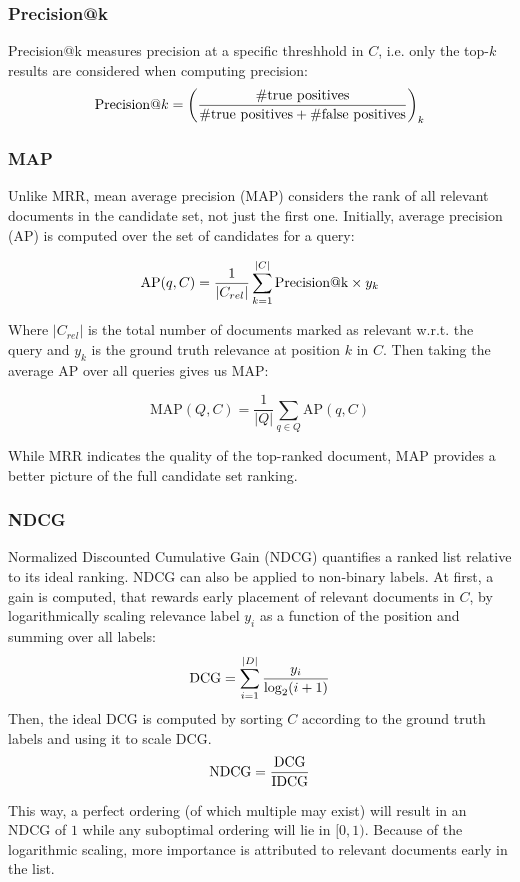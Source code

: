 \subsubsection{Precision@k}
Precision@k measures precision at a specific threshhold in $C$, i.e. only the top-$k$ results are considered when computing precision:
\begin{equation}
    \text{Precision@}k = \bigg(\frac{\text{\#true positives}}{\text{\#true positives} + \text{\#false positives}}\bigg)_k
\end{equation}

\subsubsection{MAP}
Unlike MRR, mean average precision (MAP) considers the rank of all relevant documents in the candidate set, not just the first one. Initially, average precision (AP) is computed over the set of candidates for a query:

\begin{equation}
    \text{AP}(q, C) = \frac{1}{|C_{rel}|} \sum_{k=1}^{|C|} \text{Precision@k} \times y_k
\end{equation}

Where $|C_{rel}|$ is the total number of documents marked as relevant w.r.t. the query and $y_k$ is the ground truth relevance at position $k$ in $C$. Then taking the average AP over all queries gives us MAP:

\begin{equation}
    \text{MAP}(Q, C) = \frac{1}{|Q|} \sum_{q \in Q} \text{AP}(q, C)
\end{equation}

While MRR indicates the quality of the top-ranked document, MAP provides a better picture of the full candidate set ranking.

\subsubsection{NDCG}
Normalized Discounted Cumulative Gain (NDCG) quantifies a ranked list relative to its ideal ranking. NDCG can also be applied to non-binary labels. At first, a gain is computed, that rewards early placement of relevant documents in $C$, by logarithmically scaling relevance label $y_i$ as a function of the position and summing over all labels:
\begin{equation}
    \text{DCG} = \sum_{i=1}^{|D|} \frac{y_i}{\log_2(i+1)}
\end{equation}
Then, the ideal DCG is computed by sorting $C$ according to the ground truth labels and using it to scale DCG.
\begin{equation}
    \text{NDCG} = \frac{\text{DCG}}{\text{IDCG}}
\end{equation}

This way, a perfect ordering (of which multiple may exist) will result in an NDCG of $1$ while any suboptimal ordering will lie in $[0, 1)$. Because of the logarithmic scaling, more importance is attributed to relevant documents early in the list.

